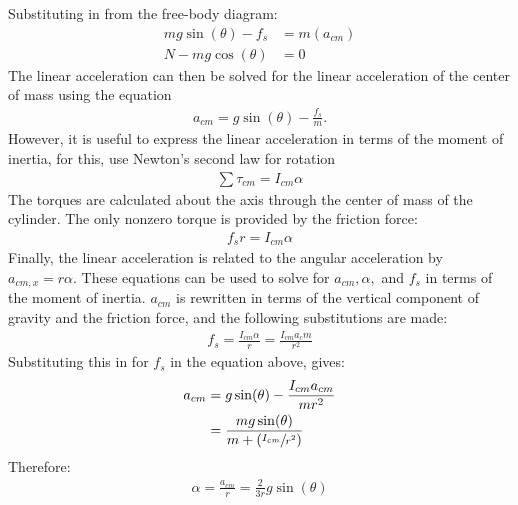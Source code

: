 \documentclass[a4paper]{article}
\begin{document}
\begin{shaded}
\begin{enumerate}
\begin{center}
        \end{center}
        Substituting in from the free-body diagram:
        \begin{align*}
            mg\sin(\theta) - f_s &= m(a_{cm})\\
            N - mg\cos(\theta) &= 0
        \end{align*}
        The linear acceleration can then be solved for the linear acceleration of the center of mass using the equation
        \begin{align*}
            a_{cm} = g\sin(\theta) - \frac{f_s}{m}.
        \end{align*}
        However, it is useful to express the linear acceleration in terms of the moment of inertia, for this, use Newton's second law for rotation
        \begin{align*}
            \sum\tau_{cm} = I_{cm}\alpha
        \end{align*}
        The torques are calculated about the axis through the center of mass of the cylinder. The only nonzero torque is provided by the friction force:
        \begin{align*}
            f_sr = I_{cm}\alpha
        \end{align*}
        Finally, the linear acceleration is related to the angular acceleration by $a_{cm,x} = r\alpha$. These equations can be used to solve for $a_{cm}, \alpha,$ and $f_s$ in terms of the moment of inertia. $a_{cm}$ is rewritten in terms of the vertical component of gravity and the friction force, and the following substitutions are made:
        \begin{align*}
            f_s = \frac{I_{cm}\alpha}{r} = \frac{I_{cm}a_cm}{r^2}
        \end{align*}
        Substituting this in for $f_s$ in the equation above, gives:
        \begin{align*}
            a_{cm} &= g\sin(\theta) - \frac{I_{cm}a_{cm}}{mr^2}\\
            &= \frac{mg\sin(\theta)}{m + (\sfrac{I_{cm}}{r^2})}
        \end{align*}
        Therefore:
        \begin{align*}
            \alpha = \frac{a_{cm}}{r} = \frac{2}{3r}g\sin(\theta)

\end{align*}
\end{enumerate}
\end{shaded}
\end{document}
